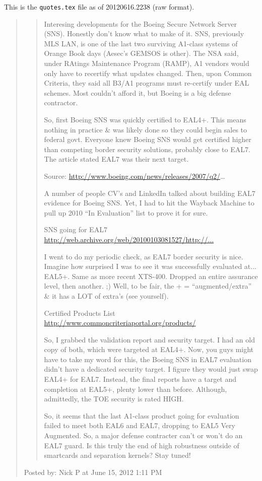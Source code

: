 \documentclass[a4paper]{article}
\begin{document}


This is the \verb,quotes.tex, file as of 20120616.2238 (raw format).

\begin{quote}
\begin{quotation}
Interesing developments for the Boeing Secure Network Server (SNS). Honestly don't know what to
make of it. SNS, previously MLS LAN, is one of the last two surviving A1-class systems of Orange
Book days (Aesec's GEMSOS is other). The NSA said, under RAtings Maintenance Program (RAMP), A1
vendors would only have to recertify what updates changed. Then, upon Common Criteria, they said
all B3/A1 programs must re-certify under EAL schemes. Most couldn't afford it, but Boeing is a big
defense contractor.

So, first Boeing SNS was quickly certified to EAL4+. This means nothing in practice \& was likely
done so they could begin sales to federal govt. Everyone knew Boeing SNS would get certified higher
than competing border security solutions, probably close to EAL7. The article stated EAL7 was their
next target.

Source: \url{http://www.boeing.com/news/releases/2007/q2/}\ldots

A number of people CV's and LinkedIn talked about building EAL7 evidence for Boeing SNS. Yet, I had
to hit the Wayback Machine to pull up 2010 ``In Evaluation'' list to prove it for sure.

SNS going for EAL7 \url{http://web.archive.org/web/20100103081527/http://...}

I went to do my periodic check, as EAL7 border security is nice. Imagine how surprised I was to see
it was successfully evaluated at... EAL5+. Same as more recent XTS-400. Dropped an entire assurance
level, then another. ;) Well, to be fair, the + = ``augmented/extra'' \& it has a LOT of extra's
(see yourself).

Certified Products List \url{http://www.commoncriteriaportal.org/products/}

So, I grabbed the validation report and security target. I had an old copy of both, which were
targeted at EAL4+. Now, you guys might have to take my word for this, the Boeing SNS in EAL7
evaluation didn't have a dedicated security target. I figure they would just swap EAL4+ for EAL7.
Instead, the final reports have a target and completion at EAL5+, plenty lower than before.
Although, admittedly, the TOE security is rated HIGH.

So, it seems that the last A1-class product going for evaluation failed to meet both EAL6 and EAL7,
dropping to EAL5 Very Augmented. So, a major defense contracter can't or won't do an EAL7 guard. Is
this truly the end of high robustness outside of smartcards and separation kernels? Stay tuned!
\end{quotation}
Posted by: Nick P at June 15, 2012 1:11 PM


\end{quote}
\end{document}
